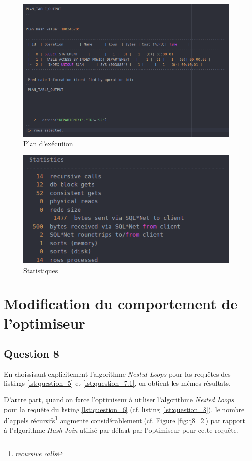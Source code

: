 \documentclass[a4paper,12pt]{article}
\begin{document}
\begin{figure}[!ht]
  \centering
  \includegraphics[scale=0.6]{images/q7_3.png}
  \caption{Plan d'exécution}
\end{figure}

\begin{figure}[!ht]
  \centering
  \includegraphics[scale=0.6]{images/q7_4.png}
  \caption{Statistiques}
\end{figure}

\newpage

\section{Modification du comportement de l'optimiseur}
\subsection{Question 8}
En choissisant explicitement l'algorithme \textit{Nested Loops} pour les requêtes des listings \ref{lst:question_5} et \ref{lst:question_7.1}, on obtient les mêmes résultats.

D'autre part, quand on force l'optimiseur à utiliser l'algorithme \textit{Nested Loops} pour la requête du listing \ref{lst:question_6} (cf. listing \ref{lst:question_8}), le nombre d'appels récursifs\footnote{\textit{recursive calls}} augmente considérablement (cf. Figure \ref{fig:q8_2}) par rapport à l'algorithme \textit{Hash Join} utilisé par défaut par l'optimiseur pour cette requête.
\end{document}
